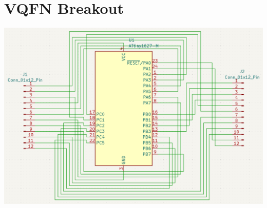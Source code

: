 \documentclass[11pt,a4paper,titlepage]{report}
\begin{document}
	\chapter{VQFN Breakout}\label{appendix:vqfn_breakout}
	\begin{center}
		\label{picture:breakout1}
		\includegraphics[scale=0.2]{assets/breakout_schematic.png}
	\end{center}
\end{document}
